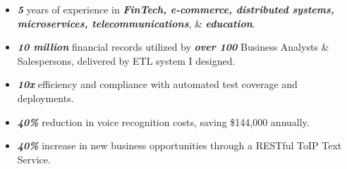 \documentclass{resume} %
\begin{document}
\introduction[
      fullname=Sean Bailey,
      email=Sean.Kuo.Work@gmail.com,
      phone=(646) 344-2210,
      location =Dallas TX,
      linkedin=www.linkedin.com/in/SeanBailey777,
      github=github.com/SeanBailey777
]


\begin{summary}
      \begin{itemize}
            \itemsep -6pt {}
            \item \textit{\textbf{5}} years of experience in \textit{\textbf{FinTech, e-commerce, distributed systems, microservices, telecommunications}}, \& \textit{\textbf{education}}.
            \item \textit{\textbf{10 million}} financial records utilized by \textit{\textbf{over 100}} Business Analysts \& Salespersons, delivered by ETL system I designed.
            \item \textit{\textbf{10x}} efficiency and compliance with automated test coverage and deployments.
            \item \textit{\textbf{40\%}} reduction in voice recognition costs, saving \$144,000 annually.
            \item \textit{\textbf{40\%}} increase in new business opportunities through a RESTful ToIP Text Service.
      \end{itemize}

\end{summary}

\skills{
\skillItem[
category=Programming Languages,
skills=C++{,} Scala{,} Clojure{,} Java{,} Salesforce{,} Snowflake SQL{,} PostgreSQL{,} JSON{,} Shell{,} HTML\\
]
\skillItem[
category=Tools \& Frameworks,
skills=Linux{,} Git{,} Docker{,} RESTful API{,} Microservices{,} AWS{,} Azure{,} Google Cloud{,} NLP
]

}
\end{document}
